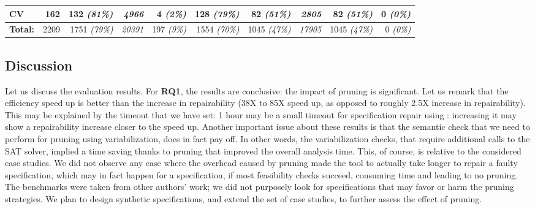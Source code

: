 \begin{table*}[ht]
\begin{center}
\begin{small}
\begin{tabular}{|l|r||r|r|r|r||r|r|r|r|}
CV & 162 & 132 \emph{\scriptsize(81\%)} & \textit{4966} & 4 \emph{\scriptsize(2\%)} & 128 \emph{\scriptsize(79\%)} & 82 \emph{\scriptsize(51\%)} & \textit{2805} & 82 \emph{\scriptsize(51\%)} & 0 \emph{\scriptsize(0\%)} \\ \hline
\rowcolor{black!5}\textbf{Total:}      & 2209 & 1751 \emph{\scriptsize(79\%)} & \textit{20391} & 197 \emph{\scriptsize(9\%)} & 1554 \emph{\scriptsize(70\%)} & 1045 \emph{\scriptsize(47\%)} & \textit{17905} & 1045 \emph{\scriptsize(47\%)} & 0 \emph{\scriptsize(0\%)} \\ \hline
\end{tabular}
\end{small}
\end{center}
\label{alloy4fun-experiments}
\end{table*}
 

\subsection{Discussion}

Let us discuss the evaluation results. For \textbf{RQ1}, the results are conclusive: the impact of pruning is significant. Let us remark that the efficiency speed up is better than the increase in repairability (38X to 85X speed up, as opposed to roughly 2.5X increase in repairability). This may be explained by the timeout that we have set: 1 hour may be a small timeout for specification repair using \technique: increasing it may show a repairability increase closer to the speed up. Another important issue about these results is that the semantic check that we need to perform for pruning using variabilization, does in fact pay off. In other words, the variabilization checks, that require additional calls to the SAT solver, implied a time saving thanks to pruning that improved the overall analysis time. This, of course, is relative to the considered case studies. We did not observe any case where the overhead caused by pruning made the tool to actually take longer to repair a faulty specification, which may in fact happen for a specification, if most feasibility checks succeed, consuming time and leading to no pruning. The benchmarks were taken from other authors' work; we did not purposely look for specifications that may favor or harm the pruning strategies. We plan to design synthetic specifications, and extend the set of case studies, to further assess the effect of pruning.

